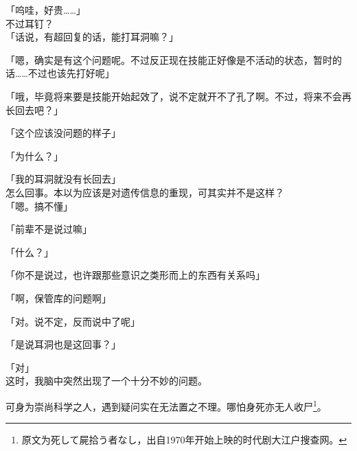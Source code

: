 「呜哇，好贵……」\\

不过耳钉？\\

「话说，有超回复的话，能打耳洞嘛？」

「嗯，确实是有这个问题呢。不过反正现在技能正好像是不活动的状态，暂时的话……不过也该先打好呢」

「哦，毕竟将来要是技能开始起效了，说不定就开不了孔了啊。不过，将来不会再长回去吧？」

「这个应该没问题的样子」

「为什么？」

「我的耳洞就没有长回去」\\

怎么回事。本以为应该是对遗传信息的重现，可其实并不是这样？\\

「嗯。搞不懂」

「前辈不是说过嘛」

「什么？」

「你不是说过，也许跟那些意识之类形而上的东西有关系吗」

「啊，保管库的问题啊」

「对。说不定，反而说中了呢」

「是说耳洞也是这回事？」

「对」\\

这时，我脑中突然出现了一个十分不妙的问题。

可身为崇尚科学之人，遇到疑问实在无法置之不理。哪怕身死亦无人收尸\footnote{原文为死して屍拾う者なし，出自1970年开始上映的时代剧大江户搜查网。}。\\

